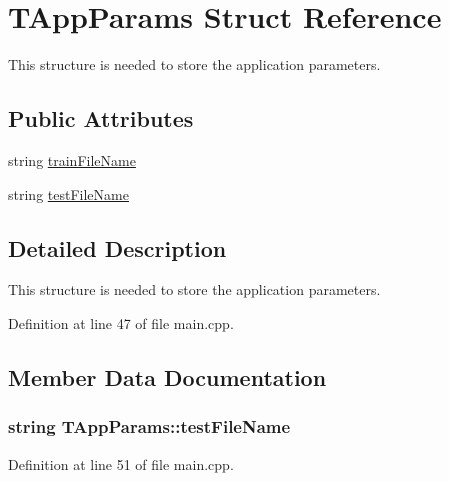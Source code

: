 \hypertarget{struct_t_app_params}{}\section{T\+App\+Params Struct Reference}
\label{struct_t_app_params}


This structure is needed to store the application parameters.  


\subsection*{Public Attributes}
\begin{DoxyCompactItemize}
\item 
string \hyperlink{struct_t_app_params_a063fb4df929a287131eecbaa44b02d90}{train\+File\+Name}
\item 
string \hyperlink{struct_t_app_params_aa507fd765fbe8670bd55bb79f978a1ba}{test\+File\+Name}
\end{DoxyCompactItemize}


\subsection{Detailed Description}
This structure is needed to store the application parameters. 

Definition at line 47 of file main.\+cpp.



\subsection{Member Data Documentation}
\hypertarget{struct_t_app_params_aa507fd765fbe8670bd55bb79f978a1ba}{}
\subsubsection[{test\+File\+Name}]{\setlength{\rightskip}{0pt plus 5cm}string T\+App\+Params\+::test\+File\+Name}\label{struct_t_app_params_aa507fd765fbe8670bd55bb79f978a1ba}


Definition at line 51 of file main.\+cpp.

\hypertarget{struct_t_app_params_a063fb4df929a287131eecbaa44b02d90}{}
